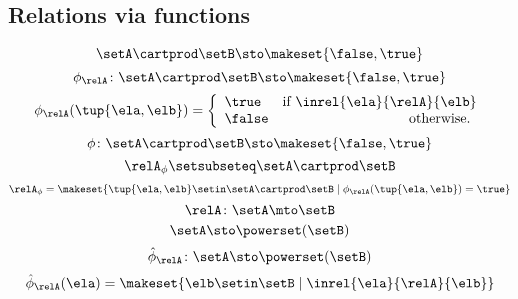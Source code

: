 \begin{forslides}
    \subsection{Relations via functions}

    \begin{equation}\label{eq:slides_session2_110}
        \setA \cartprod \setB \sto \makeset{ \false, \true }
    \end{equation}
    \begin{equation}\label{eq:slides_session2_111}
        \phi_{\relA} \colon \setA \cartprod \setB \sto \makeset{ \false, \true }
    \end{equation}
    \begin{equation}\label{eq:slides_session2_112}
        \phi_{\relA}(\tup{\ela, \elb}) =
        \left\{\begin{array}{lr}
            \true  & \text{if } \inrel{\ela}{\relA}{\elb} \\
            \false & \text{otherwise.
            }
        \end{array}
        \right.
    \end{equation}
    \begin{equation}\label{eq:slides_session2_113}
        \phi\colon \setA \cartprod \setB \sto \makeset{ \false, \true }
    \end{equation}
    \begin{equation}\label{eq:slides_session2_114}
        \relA_{\phi} \setsubseteq \setA \cartprod \setB
    \end{equation}
    \begin{equation}\label{eq:slides_session2_115}
        \relA_{\phi} = \makeset{ \tup{\ela, \elb} \setin \setA \cartprod \setB \mid \phi_{\relA}(\tup{\ela, \elb}) = \true }
    \end{equation}
    \begin{equation}\label{eq:slides_session2_116}
        \relA \colon \setA \mto \setB
    \end{equation}
    \begin{equation}\label{eq:slides_session2_117}
        \setA  \sto \powerset (\setB)
    \end{equation}
    \begin{equation}\label{eq:slides_session2_118}
        \hat \phi_{\relA} \colon \setA \sto \powerset (\setB)
    \end{equation}
    \begin{equation}\label{eq:slides_session2_119}
        \hat \phi_{\relA} (\ela) = \makeset{ \elb \setin \setB \mid \inrel{\ela}{\relA}{\elb}}

\end{equation}
\end{forslides}
